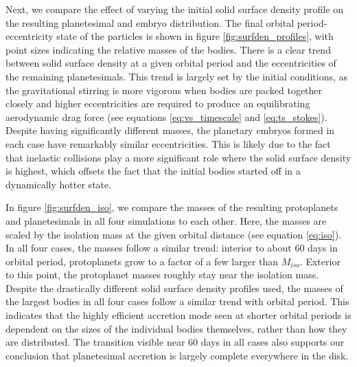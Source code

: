 \documentclass[twocolumn]{aastex63}
\begin{document}

Next, we compare the effect of varying the initial solid surface density profile on the resulting planetesimal and embryo distribution. The final orbital period-eccentricity state of the particles is shown in figure \ref{fig:surfden_profiles}, with point sizes indicating the relative masses of the bodies. There is a clear trend between solid surface density at a given orbital period and the eccentricities of the remaining planetesimals. This trend is largely set by the initial conditions, as the gravitational stirring is more vigorous when bodies are packed together closely and higher eccentricities are required to produce an equilibrating aerodynamic drag force (see equations \ref{eq:vs_timescale} and \ref{eq:ts_stokes}). Despite having significantly different masses, the planetary embryos formed in each case have remarkably similar eccentricities. This is likely due to the fact that inelastic collisions play a more significant role where the solid surface density is highest, which offsets the fact that the initial bodies started off in a dynamically hotter state.


In figure \ref{fig:surfden_iso}, we compare the masses of the resulting protoplanets and planetesimals in all four simulations to each other. Here, the masses are scaled by the isolation mass at the given orbital distance (see equation \ref{eq:iso}). In all four cases, the masses follow a similar trend: interior to about 60 days in orbital period, protoplanets grow to a factor of a few larger than $M_{iso}$. Exterior to this point, the protoplanet masses roughly stay near the isolation mass. Despite the drastically different solid surface density profiles used, the masses of the largest bodies in all four cases follow a similar trend with orbital period. This indicates that the highly efficient accretion mode seen at shorter orbital periods is dependent on the sizes of the individual bodies themselves, rather than how they are distributed. The transition visible near 60 days in all cases also supports our conclusion that planetesimal accretion is largely complete everywhere in the disk.
\end{document}
